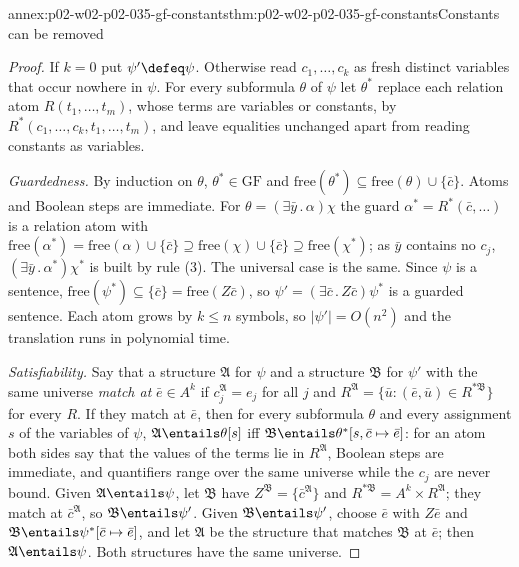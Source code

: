 \begin{annexitem}{annex:p02-w02-p02-035-gf-constants}{thm:p02-w02-p02-035-gf-constants}{Constants can be removed}
\begin{proof}
If \(k=0\) put \(\psi'\defeq\psi\).  Otherwise read \(c_1,\ldots,c_k\) as
fresh distinct variables that occur nowhere in \(\psi\).  For every
subformula \(\theta\) of \(\psi\) let \(\theta^{*}\) replace each relation
atom \(R(t_1,\ldots,t_m)\), whose terms are variables or constants, by
\(R^{*}(c_1,\ldots,c_k,t_1,\ldots,t_m)\), and leave equalities unchanged
apart from reading constants as variables.

\emph{Guardedness.}  By induction on \(\theta\),
\(\theta^{*}\in\mathrm{GF}\) and
\(\mathrm{free}(\theta^{*})\subseteq\mathrm{free}(\theta)\cup\{\bar c\}\).
Atoms and Boolean steps are immediate.  For \(\theta=(\exists\bar y\,.\,\alpha)\chi\)
the guard \(\alpha^{*}=R^{*}(\bar c,\ldots)\) is a relation atom with
\(\mathrm{free}(\alpha^{*})=\mathrm{free}(\alpha)\cup\{\bar c\}\supseteq
\mathrm{free}(\chi)\cup\{\bar c\}\supseteq\mathrm{free}(\chi^{*})\); as
\(\bar y\) contains no \(c_j\), \((\exists\bar y\,.\,\alpha^{*})\chi^{*}\) is
built by rule (3).  The universal case is the same.  Since \(\psi\) is a
sentence, \(\mathrm{free}(\psi^{*})\subseteq\{\bar c\}=\mathrm{free}(Z\bar c)\),
so \(\psi'=(\exists\bar c\,.\,Z\bar c)\psi^{*}\) is a guarded sentence.  Each
atom grows by \(k\leq n\) symbols, so \(\lvert\psi'\rvert=O(n^2)\) and the
translation runs in polynomial time.

\emph{Satisfiability.}  Say that a structure \(\mathfrak A\) for \(\psi\) and
a structure \(\mathfrak B\) for \(\psi'\) with the same universe \emph{match
at} \(\bar e\in A^k\) if \(c_j^{\mathfrak A}=e_j\) for all \(j\) and
\(R^{\mathfrak A}=\{\bar u:(\bar e,\bar u)\in R^{*\mathfrak B}\}\) for every
\(R\).  If they match at \(\bar e\), then for every subformula \(\theta\) and
every assignment \(s\) of the variables of \(\psi\),
\(\mathfrak A\entails\theta[s]\) iff
\(\mathfrak B\entails\theta^{*}[s,\bar c\mapsto\bar e]\): for an atom both
sides say that the values of the terms lie in \(R^{\mathfrak A}\), Boolean
steps are immediate, and quantifiers range over the same universe while the
\(c_j\) are never bound.  Given \(\mathfrak A\entails\psi\), let
\(\mathfrak B\) have \(Z^{\mathfrak B}=\{\bar c^{\mathfrak A}\}\) and
\(R^{*\mathfrak B}=A^k\times R^{\mathfrak A}\); they match at
\(\bar c^{\mathfrak A}\), so \(\mathfrak B\entails\psi'\).  Given
\(\mathfrak B\entails\psi'\), choose \(\bar e\) with \(Z\bar e\) and
\(\mathfrak B\entails\psi^{*}[\bar c\mapsto\bar e]\), and let \(\mathfrak A\)
be the structure that matches \(\mathfrak B\) at \(\bar e\); then
\(\mathfrak A\entails\psi\).  Both structures have the same universe.
\end{proof}
\end{annexitem}

